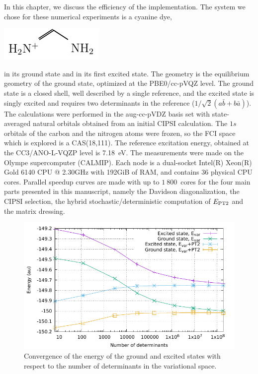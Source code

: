 \documentclass[./thesis.tex]{subfiles}
\begin{document}
\label{chap:PERF}

In this chapter, we discuss the efficiency of the implementation. The system
we chose for these numerical experiments is a cyanine dye, \\
\begin{center}
\includegraphics[]{figures/perf/Cyanine} \\
\end{center}
in its ground state and in its first excited state.
The geometry is the equilibrium geometry of the ground state, optimized at the
PBE0/cc-pVQZ level. The ground state is a closed shell, well described by a
single reference, and the excited state is singly excited and requires two
determinants in the reference ($1/\sqrt{2} (a\bar{b} + b\bar{a})$).  The
calculations were performed in the aug-cc-pVDZ basis set with state-averaged
natural orbitals obtained from an initial CIPSI calculation.
The $1s$ orbitals of the carbon and the nitrogen atoms were frozen, so
the FCI space which is explored is a CAS(18,111). The reference excitation
energy, obtained at the CC3/ANO-L-VQZP level is 7.18~eV.\cite{Send_2011}
The measurements were made on the Olympe supercomputer (CALMIP). Each node is 
a dual-socket Intel(R) Xeon(R) Gold 6140 CPU @ 2.30GHz with 192GiB of RAM, and
contains 36 physical CPU cores. Parallel speedup curves are made with up to
$1~800$~cores for the four main parts presented in this manuscript, namely the
Davidson diagonalization, the CIPSI selection, the hybrid
stochastic/deterministic computation of $E_\text{PT2}$ and the matrix dressing.

\begin{figure}[h]
	\begin{center}
		\includegraphics[width=0.8\columnwidth]{figures/perf/cn3_energy}
		\caption{Convergence of the energy of the ground and excited states with respect to the number of determinants in the variational space.}
		\label{fig:energy_pt2}
	\end{center}
\end{figure}
\end{document}
